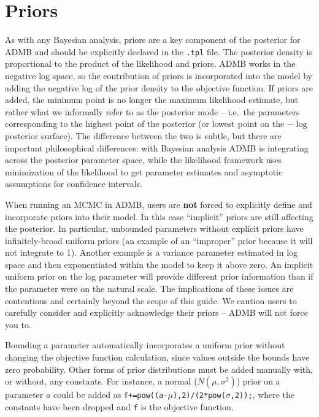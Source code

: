 \documentclass{article}\usepackage[]{graphicx}\usepackage[]{color}
\begin{document}
\section{Priors}
As with any Bayesian analysis, priors are a key component of
the posterior for ADMB and should be explicitly declared in
the \texttt{.tpl} file. The posterior density is
proportional to the product of the likelihood and
priors. ADMB works in the negative log space, so the
contribution of priors is incorporated into the model by
adding the negative log of the prior density to the
objective function. If priors are added, the minimum point
is no longer the maximum likelihood estimate, but rather
what we informally refer to as the posterior mode -- i.e.\
the parameters corresponding to the highest point of the
posterior (or lowest point on the $-\log$ posterior
surface). The difference between the two is subtle, but
there are important philosophical differences: with Bayesian
analysis ADMB is integrating across the posterior parameter
space, while the likelihood framework uses minimization of
the likelihood to get parameter estimates and asymptotic
assumptions for confidence intervals.

When running an MCMC in ADMB, users are \textbf{not} forced
to explicitly define and incorporate priors into their
model. In this case ``implicit'' priors are still affecting
the posterior. In particular, unbounded parameters without
explicit priors have infinitely-broad uniform priors (an
example of an ``improper'' prior because it will not
integrate to 1). Another example is a variance parameter
estimated in log space and then exponentiated within the
model to keep it above zero. An implicit uniform prior on
the log parameter will provide different prior information
than if the parameter were on the natural scale. The
implications of these issues are contentious and certainly
beyond the scope of this guide. We caution users to
carefully consider and explicitly acknowledge their priors
-- ADMB will not force you to.

Bounding a parameter automatically incorporates a uniform
prior without changing the objective function calculation,
since values outside the bounds have zero probability. Other
forms of prior distributions must be added manually with, or
without, any constants. For instance, a normal
($N(\mu,\sigma^2)$) prior on a parameter $a$ could be added
as \texttt{f+=pow((a-$\mu$),2)/(2*pow($\sigma$,2));}, where the
constants have been dropped and \texttt{f} is the objective
function.
\end{document}
